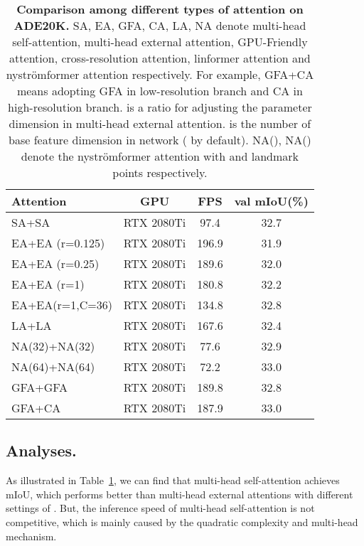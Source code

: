 \documentclass{article}
\begin{document}
\begin{table}[t]
	\begin{center}
        \caption{\textbf{Comparison among different types of attention on ADE20K.} SA, EA, GFA, CA, LA, NA denote multi-head self-attention, multi-head external attention, GPU-Friendly attention, cross-resolution attention, linformer attention and nystr{\"o}mformer attention respectively. For example, GFA+CA means adopting GFA in low-resolution branch and CA in high-resolution branch.  is a ratio for adjusting the parameter dimension  in multi-head external attention.  is the number of base feature dimension in network ( by default). NA(), NA() denote the nystr{\"o}mformer attention with  and  landmark points respectively.}
        \setlength{\tabcolsep}{1mm}
        \centering
        \begin{tabular}{l|c|c|c}
        \toprule
            Attention
            &GPU
&FPS
            &val mIoU(\%) \\
            \midrule
            SA+SA &RTX 2080Ti &97.4 &32.7\\
            EA+EA (r=0.125) &RTX 2080Ti &196.9 &31.9\\
            EA+EA (r=0.25) &RTX 2080Ti &189.6 &32.0\\
            EA+EA (r=1) &RTX 2080Ti &180.8 &32.2\\
            EA+EA(r=1,C=36)	&RTX 2080Ti	&134.8 &32.8\\
            LA+LA &RTX 2080Ti &167.6 &32.4\\
            NA(32)+NA(32) &RTX 2080Ti &77.6 &32.9\\
            NA(64)+NA(64) &RTX 2080Ti &72.2 &33.0\\
            GFA+GFA &RTX 2080Ti &189.8 &32.8\\
            GFA+CA &RTX 2080Ti &187.9 &33.0\\
        \bottomrule
        \end{tabular}
		\label{supp-tab:ablation-attention}
	\end{center}
\end{table}

\subsection{Analyses.}

As illustrated in Table~\ref{supp-tab:ablation-attention}, we can find that multi-head self-attention achieves  mIoU, which performs better than multi-head external attentions with different settings of . But, the inference speed of multi-head self-attention is not competitive, which is mainly caused by the quadratic complexity and multi-head mechanism.
\end{document}
